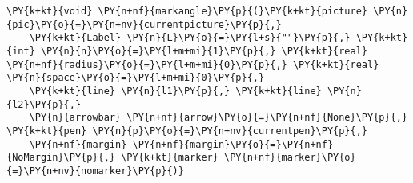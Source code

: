 \begin{Verbatim}[commandchars=\\\{\}]
    \PY{k+kt}{void} \PY{n+nf}{markangle}\PY{p}{(}\PY{k+kt}{picture} \PY{n}{pic}\PY{o}{=}\PY{n+nv}{currentpicture}\PY{p}{,}
    \PY{k+kt}{Label} \PY{n}{L}\PY{o}{=}\PY{l+s}{""}\PY{p}{,} \PY{k+kt}{int} \PY{n}{n}\PY{o}{=}\PY{l+m+mi}{1}\PY{p}{,} \PY{k+kt}{real} \PY{n+nf}{radius}\PY{o}{=}\PY{l+m+mi}{0}\PY{p}{,} \PY{k+kt}{real} \PY{n}{space}\PY{o}{=}\PY{l+m+mi}{0}\PY{p}{,}
    \PY{k+kt}{line} \PY{n}{l1}\PY{p}{,} \PY{k+kt}{line} \PY{n}{l2}\PY{p}{,}
    \PY{n}{arrowbar} \PY{n+nf}{arrow}\PY{o}{=}\PY{n+nf}{None}\PY{p}{,} \PY{k+kt}{pen} \PY{n}{p}\PY{o}{=}\PY{n+nv}{currentpen}\PY{p}{,}
    \PY{n+nf}{margin} \PY{n+nf}{margin}\PY{o}{=}\PY{n+nf}{NoMargin}\PY{p}{,} \PY{k+kt}{marker} \PY{n+nf}{marker}\PY{o}{=}\PY{n+nv}{nomarker}\PY{p}{)}
\end{Verbatim}
